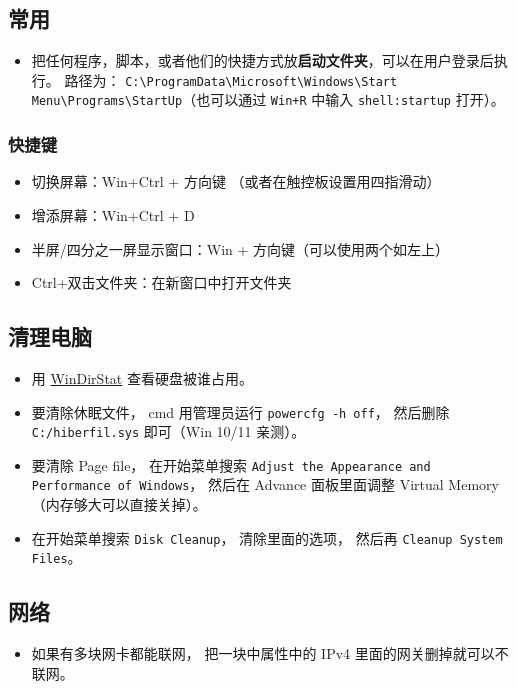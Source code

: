 
\subsection{常用}
\begin{itemize}
\item 把任何程序，脚本，或者他们的快捷方式放\textbf{启动文件夹}，可以在用户登录后执行。 路径为： \verb|C:\ProgramData\Microsoft\Windows\Start Menu\Programs\StartUp|（也可以通过 \verb|Win+R| 中输入 \verb|shell:startup| 打开）。
\end{itemize}

\subsubsection{快捷键}
\begin{itemize}
\item 切换屏幕：Win+Ctrl + 方向键 （或者在触控板设置用四指滑动）
\item 增添屏幕：Win+Ctrl + D
\item 半屏/四分之一屏显示窗口：Win + 方向键（可以使用两个如左上）
\item Ctrl+双击文件夹：在新窗口中打开文件夹
\end{itemize}

\subsection{清理电脑}
\begin{itemize}
\item 用 \href{https://windirstat.net/}{WinDirStat} 查看硬盘被谁占用。
\item 要清除休眠文件， cmd 用管理员运行 \verb|powercfg -h off|， 然后删除 \verb|C:/hiberfil.sys| 即可（Win 10/11 亲测）。
\item 要清除 Page file， 在开始菜单搜索 \verb|Adjust the Appearance and Performance of Windows|， 然后在 Advance 面板里面调整 Virtual Memory（内存够大可以直接关掉）。
\item 在开始菜单搜索 \verb|Disk Cleanup|， 清除里面的选项， 然后再 \verb|Cleanup System Files|。
\end{itemize}

\subsection{网络}
\begin{itemize}
\item 如果有多块网卡都能联网， 把一块中属性中的 IPv4 里面的网关删掉就可以不联网。
\end{itemize}

